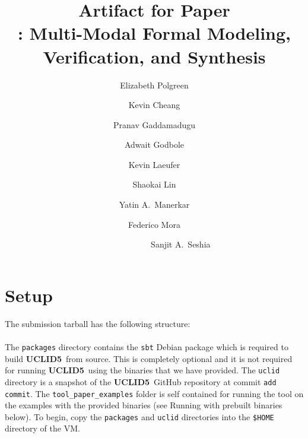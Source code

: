\documentclass[runningheads]{llncs}
\begin{document}
%
\title{Artifact for Paper \\
\uclid: Multi-Modal Formal Modeling, Verification, and Synthesis}
%
\titlerunning{\uclid}
%
\author{Elizabeth Polgreen 
 \and 
Kevin Cheang
\and
Pranav Gaddamadugu
\and
Adwait Godbole 
\and
Kevin Laeufer
\and
Shaokai Lin
\and
Yatin A.~Manerkar
\and
Federico Mora
\and ~~~~~~~~~~~~
Sanjit A.~Seshia}
%


\maketitle

\newcommand{\artcommand}[1]{\texttt{#1}}
\newcommand{\uclidcmd}{\textbf{{UCLID5}}~}

\section{Setup}

The submission tarball has the following structure:

\paragraph{}
The \artcommand{packages} directory contains the \artcommand{sbt} Debian package which is required to build \uclidcmd from source. This is completely optional and it is not required for running \uclidcmd using the binaries that we have provided.
The \artcommand{uclid} directory is a snapshot of the \uclidcmd GitHub repository at commit \texttt{add commit}. The \artcommand{tool\_paper\_examples} folder is self contained for running the tool on the examples with the provided binaries (see Running with prebuilt binaries below).
To begin, copy the \artcommand{packages} and \artcommand{uclid} directories into the \artcommand{\$HOME} directory of the VM.
\end{document}
